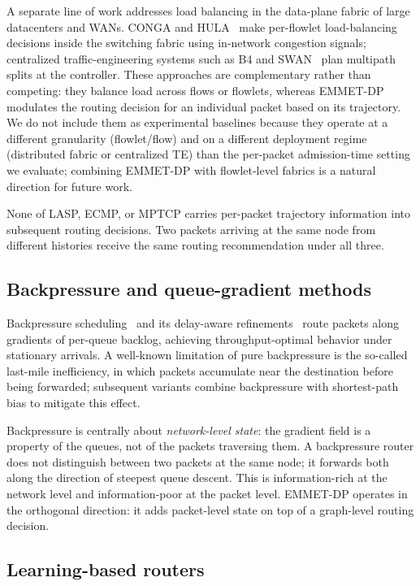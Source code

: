 A separate line of work addresses load balancing in the
data-plane fabric of large datacenters and WANs. CONGA and
HULA~\cite{alizadeh2014conga,katta2016hula} make per-flowlet
load-balancing decisions inside the switching fabric using
in-network congestion signals; centralized traffic-engineering
systems such as B4 and SWAN~\cite{jain2013b4,hong2013swan}
plan multipath splits at the controller. These approaches are
complementary rather than competing: they balance load across
flows or flowlets, whereas EMMET-DP modulates the routing
decision for an individual packet based on its trajectory. We
do not include them as experimental baselines because they
operate at a different granularity (flowlet/flow) and on a
different deployment regime (distributed fabric or centralized
TE) than the per-packet admission-time setting we evaluate;
combining EMMET-DP with flowlet-level fabrics is a natural
direction for future work.

None of LASP, ECMP, or MPTCP carries per-packet trajectory
information into subsequent routing decisions. Two packets
arriving at the same node from different histories receive the
same routing recommendation under all three.

\subsection{Backpressure and queue-gradient methods}
\label{subsec:related-backpressure}

Backpressure scheduling~\cite{tassiulas1992stability} and its
delay-aware refinements~\cite{ji2013delay} route packets along
gradients of per-queue backlog, achieving throughput-optimal
behavior under stationary arrivals. A well-known limitation of
pure backpressure is the so-called last-mile inefficiency, in
which packets accumulate near the destination before being
forwarded; subsequent variants combine backpressure with
shortest-path bias to mitigate this effect.

Backpressure is centrally about \emph{network-level state}: the
gradient field is a property of the queues, not of the packets
traversing them. A backpressure router does not distinguish
between two packets at the same node; it forwards both along the
direction of steepest queue descent. This is information-rich at
the network level and information-poor at the packet level. EMMET-DP
operates in the orthogonal direction: it adds packet-level state
on top of a graph-level routing decision.

\subsection{Learning-based routers}
\label{subsec:related-learning}

